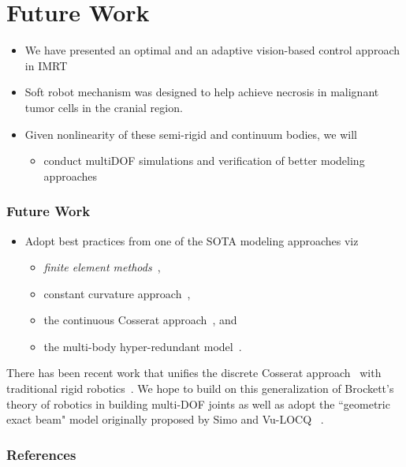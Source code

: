 \section{Future Work}

\begin{frame}
	\begin{itemize}
		\item We have presented an optimal and an adaptive 
		vision-based control approach in IMRT 
		\item Soft robot mechanism was designed to help achieve necrosis in malignant tumor  cells  in the cranial region. 
		\item Given nonlinearity of these semi-rigid and continuum bodies, we will
		
		\begin{itemize}
			\item conduct multiDOF simulations and verification of better modeling approaches 
		\end{itemize}
	\end{itemize}
\end{frame}

\begin{frame}
	\frametitle{Future Work}
	\begin{itemize}
			\item Adopt best practices from one of the SOTA modeling approaches viz
			
			\vspace{0.3cm}
			\begin{itemize}
				\item 
				\textit{finite element methods}~\cite{Coevoet2017FEM,JamesBern}, 
				\vspace{0.3cm}
				\item constant curvature approach~\cite{godage2016dynamics}, 
				\vspace{0.3cm}
				\item the continuous Cosserat approach~\cite{Renda2014Cosserat}, and 
				\vspace{0.3cm}
				\item the multi-body hyper-redundant model~\cite{kang12hyper}. 
			\end{itemize}
	\end{itemize}
\end{frame}

There has been recent work that unifies the discrete Cosserat approach~\cite{renda16discrete} with traditional rigid robotics~\cite{Renda2018ICRA}. We hope to build on this generalization of Brockett's theory of robotics in building multi-DOF joints as well as adopt the ``geometric exact beam" model originally proposed by Simo and Vu-LOCQ ~\cite{simo88}.


\begin{frame}
\frametitle{References}
\centering

\end{frame}
